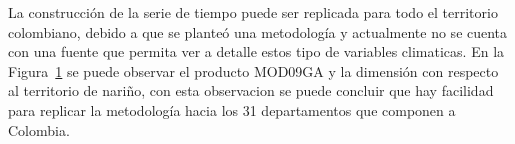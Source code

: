 La construcción de la serie de tiempo puede ser replicada para todo el territorio colombiano, debido a que se planteó una metodología y actualmente no se cuenta con una
fuente que permita ver a detalle estos tipo de variables climaticas. En la Figura~\ref{fig:colombia} se puede observar el producto MOD09GA y la dimensión con respecto al 
territorio de nariño, con esta observacion se puede concluir que hay facilidad para replicar la metodología hacia los 31 departamentos que componen a Colombia.
\begin{figure}[htb]
  \centering
  \label{fig:colombia}
\end{figure}

